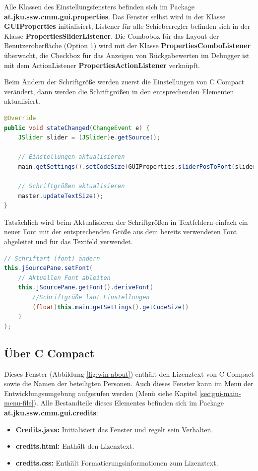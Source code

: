 Alle Klassen des Einstellungsfensters befinden sich im Package \textbf{at.jku.ssw.cmm.gui.properties}. Das Fenster selbst wird in der Klasse \textbf{GUIProperties} initialisiert, Listener für alle Schieberregler befinden sich in der Klasse \textbf{PropertiesSliderListener}. Die Combobox für das Layout der Benutzeroberfläche (Option 1) wird mit der Klasse \textbf{PropertiesComboListener} überwacht, die Checkbox für das Anzeigen von Rückgabewerten im Debugger ist mit dem ActionListener \textbf{PropertiesActionListener} verknüpft.

Beim Ändern der Schriftgröße werden zuerst die Einstellungen von C Compact verändert, dann werden die Schriftgrößen in den entsprechenden Elementen aktualisiert.
\begin{lstlisting}[language=JAVA]
@Override
public void stateChanged(ChangeEvent e) {
	JSlider slider = (JSlider)e.getSource();
	
	// Einstellungen aktualisieren
	main.getSettings().setCodeSize(GUIProperties.sliderPosToFont(slider.getValue()));
	
	// Schriftgrößen aktualisieren
	master.updateTextSize();
}
\end{lstlisting}

Tatsächlich wird beim Aktualisieren der Schriftgrößen in Textfeldern einfach ein neuer Font mit der entsprechenden Größe aus dem bereits verwendeten Font abgeleitet und für das Textfeld verwendet.
\begin{lstlisting}[language=JAVA]
// Schriftart (font) ändern
this.jSourcePane.setFont(
	// Aktuellen Font ableiten
	this.jSourcePane.getFont().deriveFont(
		//Schriftgröße laut Einstellungen
		(float)this.main.getSettings().getCodeSize()
	)
);
\end{lstlisting}

\subsection{Über C Compact}
\label{sec:win-credits}
Dieses Fenster (Abbildung \ref{fig:win-about}) enthält den Lizenztext von C Compact sowie die Namen der beteiligten Personen. Auch dieses Fenster kann im Menü der Entwicklungsumgebung aufgerufen werden (Menü siehe Kapitel \ref{sec:gui-main-menu-file}). Alle Bestandteile dieses Elementes befinden sich im Package \textbf{at.jku.ssw.cmm.gui.credits}:
\begin{itemize}
\item \textbf{Credits.java:} Initialisiert das Fenster und regelt sein Verhalten.
\item \textbf{credits.html:} Enthält den Lizenztext.
\item \textbf{credits.css:} Enthält Formatierungsinformationen zum Lizenztext.
\end{itemize}

